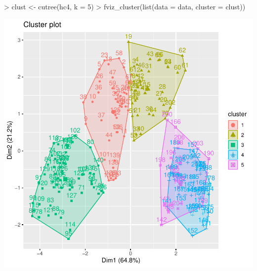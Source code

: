 \documentclass [a4paper] {article}
\begin{document}
\begin{Schunk}
\begin{Sinput}
> clust <- cutree(hc4, k = 5)
> fviz_cluster(list(data = data, cluster = clust))
\end{Sinput}
\end{Schunk}
\includegraphics{entrega-jerarquico_4}
\end{document}
